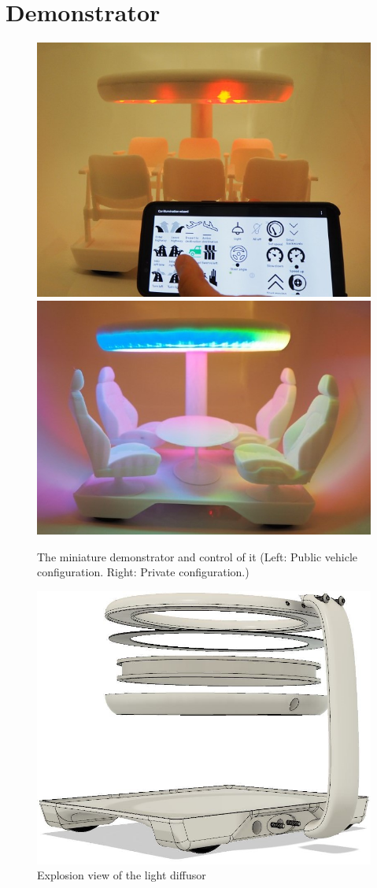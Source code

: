 \section{Demonstrator}

\begin{figure}
     \includegraphics[height=0.36\textwidth]{fig/public.JPG}\hfill\includegraphics[height=0.36\textwidth]{fig/private.JPG}
    \caption[Desktop Demonstrator]{The miniature demonstrator and control of it (Left:  Public vehicle configuration. Right: Private configuration.)}
    \label{fig:demonstrator}
\end{figure}
\begin{figure}
\includegraphics[height=0.38\textwidth]{fig/explosion.JPG}
    \caption[Explosion-view Demonstrator]{Explosion view of the light diffusor}
    \label{fig:demonstratorExplosion}
\end{figure}
